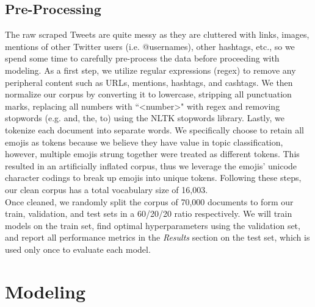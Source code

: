 \documentclass[11pt]{article}
\begin{document}
\subsection{Pre-Processing}

The raw scraped Tweets are quite messy as they are cluttered with links, images, mentions of other Twitter users (i.e. @usernames), other hashtags, etc., so we spend some time to carefully pre-process the data before proceeding with modeling. As a first step, we utilize regular expressions (regex) to remove any peripheral content such as URLs, mentions, hashtags, and cashtags. We then normalize our corpus by converting it to lowercase, stripping all punctuation marks, replacing all numbers with ``\textless number\textgreater" with regex and removing stopwords (e.g. and, the, to) using the NLTK stopwords library. Lastly, we tokenize each document into separate words. We specifically choose to retain all emojis as tokens because we believe they have value in topic classification, however, multiple emojis strung together were treated as different tokens. This resulted in an artificially inflated corpus, thus we leverage the emojis' unicode character codings to break up emojis into unique tokens. Following these steps, our clean corpus has a total vocabulary size of 16,003.
\\[5pt]
\noindent Once cleaned, we randomly split the corpus of 70,000 documents to form our train, validation, and test sets in a 60/20/20 ratio respectively. We will train models on the train set, find optimal hyperparameters using the validation set, and report all performance metrics in the \emph{Results} section on the test set, which is used only once to evaluate each model.




\section{Modeling}
\end{document}
